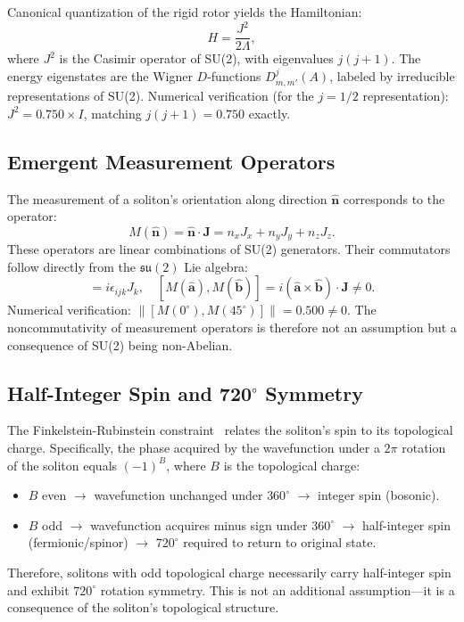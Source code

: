 \documentclass[11pt,a4paper]{article}
\begin{document}
Canonical quantization of the rigid rotor yields the Hamiltonian:
\begin{equation}
H = \frac{J^2}{2\Lambda},
\end{equation}
where $J^2$ is the Casimir operator of SU(2), with eigenvalues $j(j+1)$. The energy eigenstates are the Wigner $D$-functions $D^j_{m,m'}(A)$, labeled by irreducible representations of SU(2). Numerical verification (for the $j = 1/2$ representation): $J^2 = 0.750 \times I$, matching $j(j+1) = 0.750$ exactly.

\subsection{Emergent Measurement Operators}

The measurement of a soliton's orientation along direction $\hat{\mathbf{n}}$ corresponds to the operator:
\begin{equation}
M(\hat{\mathbf{n}}) = \hat{\mathbf{n}} \cdot \mathbf{J} = n_x J_x + n_y J_y + n_z J_z.
\end{equation}
These operators are linear combinations of SU(2) generators. Their commutators follow directly from the $\mathfrak{su}(2)$ Lie algebra:
\begin{equation}
[J_i, J_j] = i\epsilon_{ijk} J_k, \quad [M(\hat{\mathbf{a}}), M(\hat{\mathbf{b}})] = i(\hat{\mathbf{a}} \times \hat{\mathbf{b}}) \cdot \mathbf{J} \neq 0.
\end{equation}
Numerical verification: $\|[M(0^\circ), M(45^\circ)]\| = 0.500 \neq 0$. The noncommutativity of measurement operators is therefore not an assumption but a consequence of SU(2) being non-Abelian.

\subsection{Half-Integer Spin and 720$^\circ$ Symmetry}

The Finkelstein-Rubinstein constraint~\cite{fr1968} relates the soliton's spin to its topological charge. Specifically, the phase acquired by the wavefunction under a $2\pi$ rotation of the soliton equals $(-1)^B$, where $B$ is the topological charge:
\begin{itemize}
\item $B$ even $\to$ wavefunction unchanged under $360^\circ$ $\to$ integer spin (bosonic).
\item $B$ odd $\to$ wavefunction acquires minus sign under $360^\circ$ $\to$ half-integer spin (fermionic/spinor) $\to$ $720^\circ$ required to return to original state.
\end{itemize}
Therefore, solitons with odd topological charge necessarily carry half-integer spin and exhibit $720^\circ$ rotation symmetry. This is not an additional assumption---it is a consequence of the soliton's topological structure.
\end{document}
